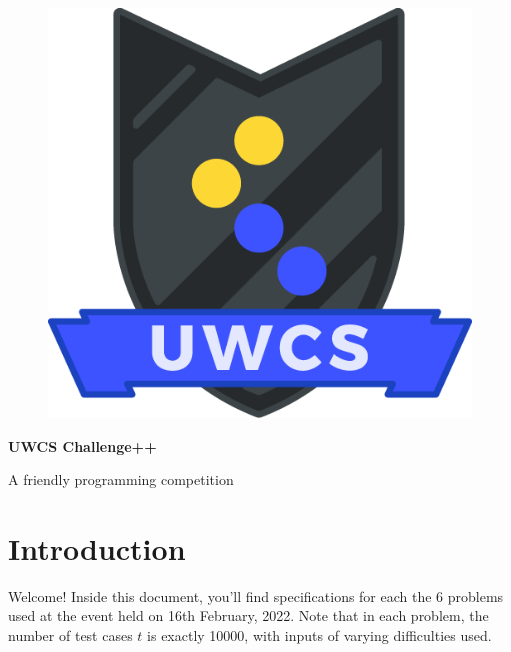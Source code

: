 \documentclass[a4paper,12pt,parskip=half-]{scrartcl}
\begin{document}
\begin{figure}
    \vspace{-10pt} %
    \includegraphics[width=0.8\linewidth]{shield.png} %
    \vspace{-100pt} %
\end{figure}

\normalfont \Huge \bfseries UWCS Challenge++

\normalfont\Large A friendly programming competition
\normalsize

\section*{Introduction}

Welcome! 
Inside this document, you'll find specifications for each the 6 problems used at the event held on 16th February, 2022. Note that in each problem, the number of test cases $t$ is exactly 10000, with inputs of varying difficulties used.



\tableofcontents

\newpage



\newpage

\newpage

\newpage

\newpage

\newpage

\end{document}
